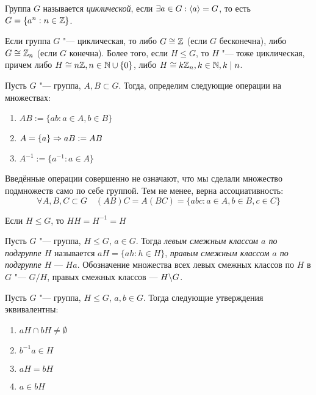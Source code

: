 \begin{definition}
	Группа $G$ называется \textit{циклической}, если $\exists a \hm\in G: \langle a\rangle = G$, то есть $G = \{a^n: n \in \mathbb{Z}\}$.
\end{definition}

\begin{reminder}
	Если группа $G$ "--- циклическая, то либо $G \cong \mathbb{Z}$ (если $G$ бесконечна), либо $G \cong \mathbb{Z}_n$ (если $G$ конечна). Более того, если $H \le G$, то $H$ "--- тоже циклическая, причем либо $H \cong n\mathbb{Z}, n \in \mathbb{N}\cup\{0\}$, либо $H \cong k\mathbb{Z}_n, k \in \mathbb{N}, k\mid n$.
\end{reminder}

\begin{definition}
	Пусть $G$ "--- группа, $A, B \subset G$. Тогда, определим следующие операции на множествах:
	\begin{enumerate}
		\item $AB := \{ab: a \in A, b \in B\}$
		
		\item $A = \{a\} \Rightarrow aB := AB$
		
		\item $A^{-1} := \{a^{-1}: a \in A\}$
	\end{enumerate}
\end{definition}

\begin{note}
	Введённые операции совершенно не означают, что мы сделали множество подмножеств само по себе группой. Тем не менее, верна ассоциативность:
	\[
		\forall A, B, C \subset G \quad (AB)C = A(BC) = \{abc \colon a \in A, b \in B, c \in C\}
	\]
\end{note}

\begin{note}
	Если $H \le G$, то $HH = H^{-1} = H$
\end{note}

\begin{definition}
	Пусть $G$ "--- группа, $H \le G$, $a \in G$. Тогда \textit{левым смежным классом $a$ по подгруппе $H$} называется $aH = \{ah: h \in H\}$, \textit{правым смежным классом $a$ по подгруппе $H$} --- $Ha$. Обозначение множества всех левых смежных классов по $H$ в $G$ "--- $G/H$, правых смежных классов --- $H\backslash G$.
\end{definition}

\begin{proposition}
	Пусть $G$ "--- группа, $H \le G$, $a, b \in G$. Тогда следующие утверждения эквивалентны:
	\begin{enumerate}
		\item $aH \cap bH \ne \emptyset$
		\item $b^{-1}a \in H$
		\item $aH = bH$
		\item $a \in bH$
	\end{enumerate}
\end{proposition}

